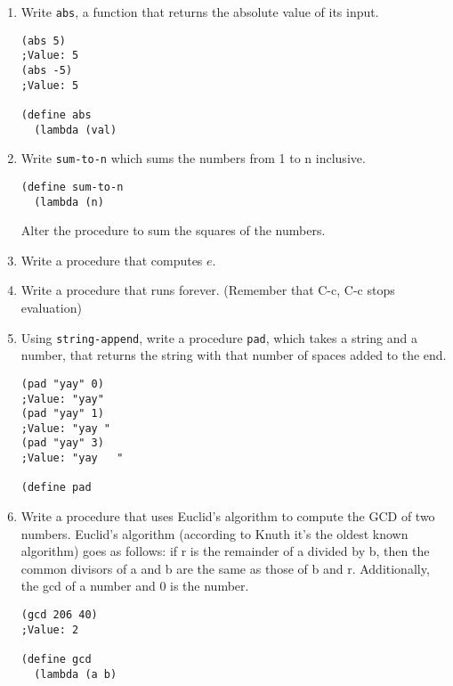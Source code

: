 \begin{enumerate}
\item Write {\tt abs}, a function that returns the absolute value of
its input.

\begin{verbatim}
(abs 5)
;Value: 5
(abs -5)
;Value: 5

(define abs
  (lambda (val)
\end{verbatim}
\vspace{1in}

\item Write {\tt sum-to-n} which sums the numbers from 1 to n
inclusive.

\begin{verbatim}
(define sum-to-n
  (lambda (n)
\end{verbatim}
\vspace{1in}
Alter the procedure to sum the squares of the numbers.

\item Write a procedure that computes $e$.
\vspace{1.5in}

\item Write a procedure that runs forever.  (Remember that C-c, C-c stops evaluation)
\vspace{1in}

\item Using {\tt string-append}, write a procedure {\tt pad}, which
takes a string and a number, that returns the string with
that number of spaces added to the end.

\begin{verbatim}
(pad "yay" 0)
;Value: "yay"
(pad "yay" 1)
;Value: "yay "
(pad "yay" 3)
;Value: "yay   "

(define pad
\end{verbatim}
\vspace{1in}

\item Write a procedure that uses Euclid's algorithm to compute the GCD of
two numbers.  Euclid's algorithm (according to Knuth it's the oldest
known algorithm) goes as follows: if r is the remainder of a divided
by b, then the common divisors of a and b are the same as those of b
and r.  Additionally, the gcd of a number and 0 is the number.

\begin{verbatim}
(gcd 206 40)
;Value: 2

(define gcd
  (lambda (a b)
\end{verbatim}
\end{enumerate}

